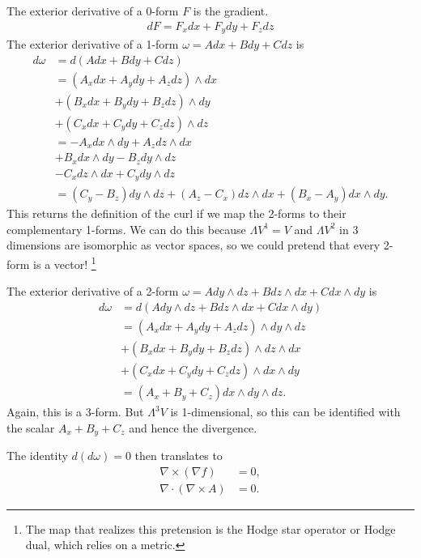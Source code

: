 \documentclass[aps,nofootinbib]{revtex4}
\begin{document}
The exterior derivative of a 0-form $F$ is the gradient.
\begin{align}
dF = F_x dx + F_y dy + F_z dz 
\end{align}
The exterior derivative of a 1-form $\omega = A dx + B dy + C dz$ is
\begin{align*}
d\omega &= d (A dx + B dy + C dz) \\
	&= (A_x dx + A_y dy + A_z dz) \wedge dx \\
    & + (B_x dx + B_y dy + B_z dz) \wedge dy \\
    & + (C_x dx + C_y dy + C_z dz) \wedge dz \\
    &= - A_x dx \wedge dy + A_z dz \wedge dx \\
    & + B_x dx \wedge dy - B_z dy \wedge dz \\
    & - C_x dz \wedge dx + C_y dy \wedge dz \\ 
    &= (C_y-B_z) dy \wedge dz + (A_z - C_x) dz \wedge dx + (B_x - A_y) dx \wedge dy.
\end{align*}
This returns the definition of the curl if we map the 2-forms to their complementary 1-forms. We can do this because $\Lambda V^1 = V$ and $\Lambda V^2$ in 3 dimensions are isomorphic as vector spaces, so we could pretend that every 2-form is a vector! \footnote{The map that realizes this pretension is the Hodge star operator or Hodge dual, which relies on a metric.}

The exterior derivative of a 2-form $\omega = A dy \wedge dz + B dz \wedge dx + C dx \wedge dy$ is
\begin{align*}
d\omega &= d(A dy \wedge dz + B dz \wedge dx + C dx \wedge dy) \\
	&= (A_x dx + A_y dy + A_z dz) \wedge dy \wedge dz \\
    &+ (B_x dx + B_y dy + B_z dz) \wedge dz \wedge dx \\
    &+ (C_x dx + C_y dy + C_z dz) \wedge dx \wedge dy \\
    &= (A_x + B_y + C_z) dx \wedge dy \wedge dz.
\end{align*}
Again, this is a 3-form. But $\Lambda^3 V$ is 1-dimensional, so this can be identified with the scalar $A_x + B_y + C_z$ and hence the divergence.

The identity $d(d\omega) = 0$ then translates to
\begin{align*}
\nabla \times (\nabla f) &= 0, \\
\nabla \cdot (\nabla \times A) &= 0.
\end{align*}
\end{document}
